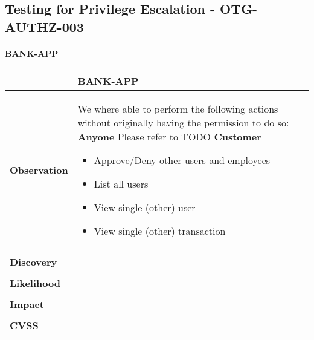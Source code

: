\subsection{Testing for Privilege Escalation - OTG-AUTHZ-003}
\paragraph{BANK-APP} \mbox{}
\begin{longtable*}{p{.20\textwidth} | p{.80\textwidth}}
    \hline
    & \textbf{BANK-APP} \\ 
    \hline
    \textbf{Observation} &
        We where able to perform the following actions without originally having the permission to do so: \newline
        \textbf{Anyone}\newline
        Please refer to TODO\newline
        \textbf{Customer}\newline
        \begin{itemize}
		  \item Approve/Deny other users and employees
		  \item List all users
		  \item View single (other) user
		  \item View single (other) transaction
		\end{itemize}
    \\\\
    \textbf{Discovery} &
        
    \\\\
    \textbf{Likelihood} &
        
    \\\\
    \textbf{Impact} &
       
    \\\\
    \textbf{CVSS} &
        
    \\
    \hline
\end{longtable*}
